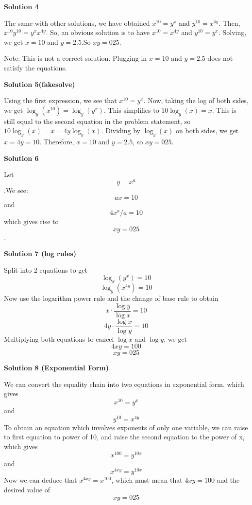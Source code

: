\begin{enumerate}
\textbf{Solution 4}

The same with other solutions, we have obtained $x^{10}=y^x$ and $y^{10}=x^{4y}$. Then, $x^{10}y^{10}=y^xx^{4y}$. So, an obvious solution is to have $x^{10}=x^{4y}$ and $y^{10}=y^{x}$. Solving, we get $x=10$ and $y=2.5$.So $xy = \boxed{025}$.

 Note: This is not a correct solution. Plugging in $x=10$ and $y=2.5$ does not satisfy the equations.

 



\textbf{Solution 5(fakesolve)}

Using the first expression, we see that $x^{10} = y^x$. Now, taking the log of both sides, we get $\log_y(x^{10}) = \log_y(y^x)$. This simplifies to $10 \log_y(x) = x$. This is still equal to the second equation in the problem statement, so $10 \log_y(x) = x = 4y \log_y(x)$. Dividing by $\log_y(x)$ on both sides, we get $x = 4y = 10$. Therefore, $x = 10$ and $y = 2.5$, so $xy = \boxed{025}$.

 



\textbf{Solution 6}

Let 
 \[y=x^a\].We see: 
 \[ax=10\] and 
 \[4x^a/a=10\]which gives rise to 
 \[xy = \boxed{025}\].

 



\textbf{Solution 7 (log rules)}

Split into 2 equations to get 
 \[\log_x\left(y^x\right)=10\] 
 \[\log_y\left(x^{4y}\right)=10\]Now use the logarithm power rule and the change of base rule to obtain 
 \[x\cdot\frac{\log y}{\log x}=10\] 
 \[4y\cdot\frac{\log x}{\log y}=10\] Multiplying both equations to cancel $\log x$ and $\log y$, we get 
 \[4xy = 100\] 
 \[xy = \boxed{025}\]




\textbf{Solution 8 (Exponential Form)}

We can convert the equality chain into two equations in exponential form, which gives 
 \[x^{10} = y^{x}\] and 
 \[y^{10} = x^{4y}\]To obtain an equation which involves exponents of only one variable, we can raise to first equation to power of 10, and raise the second equation to the power of x, which gives 
 \[x^{100} = y^{10x}\] and 
 \[x^{4xy} = y^{10x}\] Now we can deduce that $x^{4xy} = x^{100}$, which must mean that $4xy = 100$ and the desired value of 
 \[xy = \boxed{025}\]




\end{enumerate}
